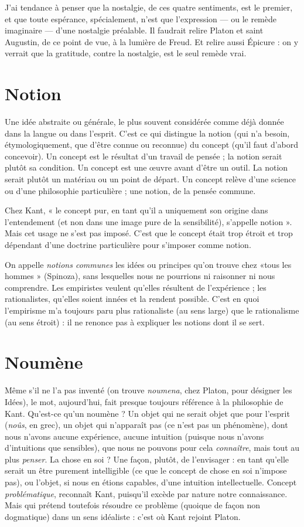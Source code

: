 J'ai tendance à penser que la nostalgie, de ces quatre sentiments, est le premier,
et que toute espérance, spécialement, n’est que l’expression — ou le
remède imaginaire — d’une nostalgie préalable. Il faudrait relire Platon et saint
Augustin, de ce point de vue, à la lumière de Freud. Et relire aussi Épicure : on
y verrait que la gratitude, contre la nostalgie, est le seul remède vrai.

\section{Notion}
Une idée abstraite ou générale, le plus souvent considérée comme
déjà donnée dans la langue ou dans l’esprit. C’est ce qui distingue
la notion (qui n’a besoin, étymologiquement, que d’être connue ou reconnue)
du concept (qu’il faut d’abord concevoir). Un concept est le résultat d’un travail
de pensée ; la notion serait plutôt sa condition. Un concept est une œuvre
avant d’être un outil. La notion serait plutôt un matériau ou un point de
départ. Un concept relève d’une science ou d’une philosophie particulière ; une
notion, de la pensée commune.

Chez Kant, « le concept pur, en tant qu’il a uniquement son origine dans
l’entendement (et non dans une image pure de la sensibilité), s'appelle notion ».
Mais cet usage ne s’est pas imposé. C’est que le concept était trop étroit et trop
dépendant d’une doctrine particulière pour s'imposer comme notion.

On appelle {\it notions communes} les idées ou principes qu’on trouve chez
«tous les hommes » (Spinoza), sans lesquelles nous ne pourrions ni raisonner
ni nous comprendre. Les empiristes veulent qu’elles résultent de l’expérience ;
les rationalistes, qu’elles soient innées et la rendent possible. C’est en quoi
l’empirisme m’a toujours paru plus rationaliste (au sens large) que le rationalisme
(au sens étroit) : il ne renonce pas à expliquer les notions dont il se sert.

\section{Noumène}
Même s’il ne l'a pas inventé (on trouve {\it noumena}, chez Platon,
pour désigner les Idées), le mot, aujourd’hui, fait presque toujours
référence à la philosophie de Kant. Qu'est-ce qu’un noumène ? Un objet
qui ne serait objet que pour l'esprit ({\it noûs}, en grec), un objet qui n'apparaît pas
(ce n’est pas un phénomène), dont nous n’avons aucune expérience, aucune
intuition (puisque nous n’avons d’intuitions que sensibles), que nous ne pouvons
pour cela {\it connaître}, mais tout au plus {\it penser}. La chose en soi ? Une façon,
plutôt, de l’envisager : en tant qu’elle serait un être purement intelligible (ce
que le concept de chose en soi n’impose pas), ou l'objet, si nous en étions
capables, d’une intuition intellectuelle. Concept {\it problématique}, reconnaît
Kant, puisqu'il excède par nature notre connaissance. Mais qui prétend toutefois
résoudre ce problème (quoique de façon non dogmatique) dans un sens
idéaliste : c’est où Kant rejoint Platon.

